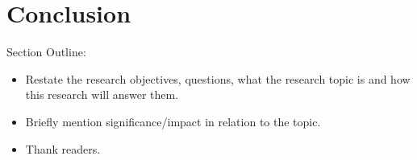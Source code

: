 \chapter{\leavevmode Conclusion}
\label{chap:conclusion}

Section Outline:
\begin{itemize}
  \item Restate the research objectives, questions, what the research topic is and how this research will answer them.
  \item Briefly mention significance/impact in relation to the topic.
  \item Thank readers.
\end{itemize}


